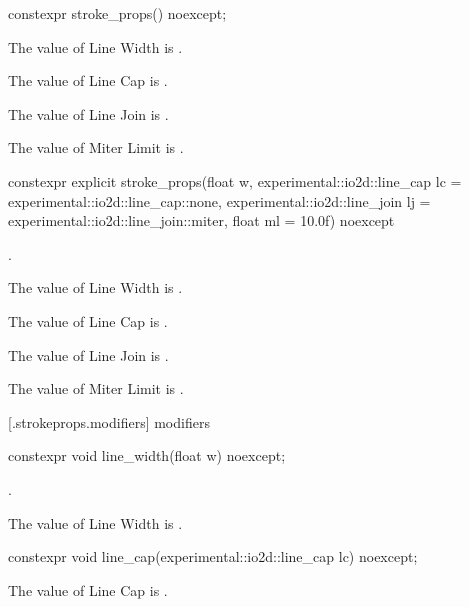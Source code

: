 \begin{itemdecl}
constexpr stroke_props() noexcept;
\end{itemdecl}
\begin{itemdescr}
\pnum
\effects
The value of Line Width is .

\pnum
The value of Line Cap is .

\pnum
The value of Line Join is .

\pnum
The value of Miter Limit is .
\end{itemdescr}

\begin{itemdecl}
constexpr explicit stroke_props(float w,
  experimental::io2d::line_cap lc = experimental::io2d::line_cap::none,
  experimental::io2d::line_join lj = experimental::io2d::line_join::miter,
  float ml = 10.0f) noexcept    
\end{itemdecl}
\begin{itemdescr}
\pnum
\requires
{}.

\pnum
{}

\pnum
\effects
The value of Line Width is .

\pnum
The value of Line Cap is .

\pnum
The value of Line Join is .

\pnum
The value of Miter Limit is .
\end{itemdescr}

 [\iotwod.strokeprops.modifiers] { modifiers}

\begin{itemdecl}
constexpr void line_width(float w) noexcept;
\end{itemdecl}
\begin{itemdescr}
\pnum
\requires
{}.

\pnum
\effects
The value of Line Width is .
\end{itemdescr}

\begin{itemdecl}
constexpr void line_cap(experimental::io2d::line_cap lc) noexcept;
\end{itemdecl}
\begin{itemdescr}
\pnum
\effects
The value of Line Cap is .
\end{itemdescr}

